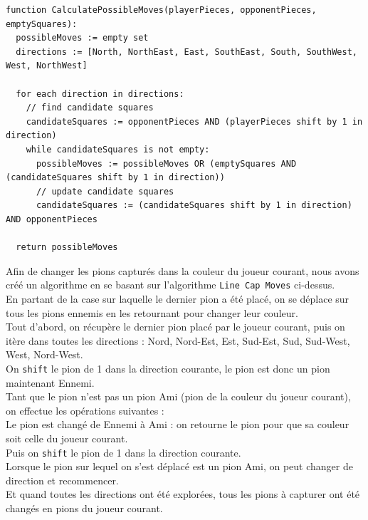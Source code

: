 \documentclass[a4paper,12pt]{article}
\begin{document}
\begin{lstlisting}[caption={Pseudocode pour l'algorithme line\_cap\_move\ : fonction CalculatePossibleMoves}, label={lst:calculate_possible_moves}]
function CalculatePossibleMoves(playerPieces, opponentPieces, emptySquares):
  possibleMoves := empty set
  directions := [North, NorthEast, East, SouthEast, South, SouthWest, West, NorthWest]

  for each direction in directions:
    // find candidate squares
    candidateSquares := opponentPieces AND (playerPieces shift by 1 in direction)
    while candidateSquares is not empty:
      possibleMoves := possibleMoves OR (emptySquares AND (candidateSquares shift by 1 in direction))
      // update candidate squares
      candidateSquares := (candidateSquares shift by 1 in direction) AND opponentPieces

  return possibleMoves
\end{lstlisting}

\newpage

Afin de changer les pions capturés dans la couleur du joueur courant, nous
avons créé un algorithme en se basant sur l’algorithme \texttt{Line Cap Moves}
ci-dessus.\\ En partant de la case sur laquelle le dernier pion a été placé, on
se déplace sur tous les pions ennemis en les retournant pour changer leur
couleur.\\ Tout d’abord, on récupère le dernier pion placé par le joueur
courant, puis on itère dans toutes les directions : Nord, Nord-Est, Est,
Sud-Est, Sud, Sud-West, West, Nord-West.\\ On \texttt{shift} le pion de 1 dans
la direction courante, le pion est donc un pion maintenant Ennemi.\\ Tant que
le pion n’est pas un pion Ami (pion de la couleur du joueur courant), on
effectue les opérations suivantes :\\ Le pion est changé de Ennemi à Ami : on
retourne le pion pour que sa couleur soit celle du joueur courant.\\ Puis on
\texttt{shift} le pion de 1 dans la direction courante.\\ Lorsque le pion sur
lequel on s’est déplacé est un pion Ami, on peut changer de direction et
recommencer.\\ Et quand toutes les directions ont été explorées, tous les pions
à capturer ont été changés en pions du joueur courant.\\
\end{document}
